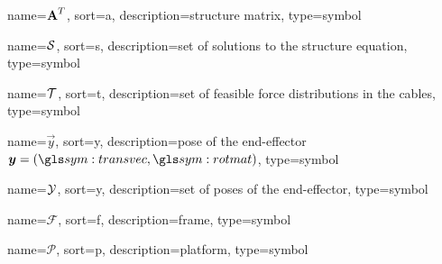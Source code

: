 	{%
		name=\ensuremath{{\mat{A}^T}},
		sort=a,
		description=structure matrix,
		type=symbol
	}
	\newcommand{\strucmat}{\gls{sym:strucmat}}

	{%
		name=\ensuremath{\set{S}},
		sort=s,
		description=set of solutions to the structure equation,
		type=symbol
	}
	\newcommand{\setsolstruceq}{\gls{sym:setsolstruceq}}

	{%
		name=\ensuremath{\set{T}},
		sort=t,
		description=set of feasible force distributions in the cables,
		type=symbol
	}
	\newcommand{\setoffeasibleforces}{\gls{sym:setoffeasibleforces}}

	{%
		name=\ensuremath{\vec{y}},
		sort=y,
		description=pose of the end-effector \ensuremath{\vec{y} = (\transvec, \rotmatbare)},
		type=symbol
	}
	\newcommand{\pose}{\gls{sym:pose}}

	{%
		name=\ensuremath{\set{Y}},
		sort=y,
		description=set of poses of the end-effector,
		type=symbol
	}
	\newcommand{\setofposes}{\gls{sym:setofposes}}

	{%
		name=\ensuremath{\mathscr{F}},
		sort=f,
		description=frame,
		type=symbol
	}
	\newcommand{\framesym}{\gls{sym:frame}}

	{%
		name=\ensuremath{\mathscr{P}},
		sort=p,
		description=platform,
		type=symbol
	}
	\newcommand{\platform}{\gls{sym:platform}}
	\newcommand{\platformframe}{\framesym_{\platform}}
	\newcommand{\worldframe}{\framesym_{0}} %

